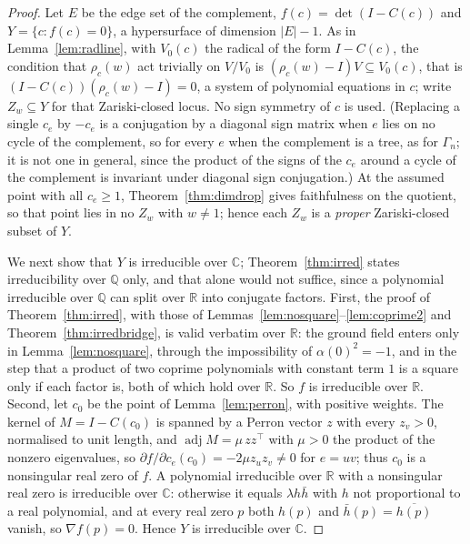 \documentclass[11pt]{article}
\theoremstyle{definition}
\theoremstyle{remark}
\theoremstyle{definition}
\newcommand{\Q}{\mathbb{Q}}
\newcommand{\R}{\mathbb{R}}
\newcommand{\C}{\mathbb{C}}
\begin{document}
\begin{proof}
Let $E$ be the edge set of the complement, $f(c)=\det(I-C(c))$ and $Y=\{c:f(c)=0\}$, a
hypersurface of dimension $|E|-1$. As in Lemma~\ref{lem:radline}, with $V_0(c)$ the radical of
the form $I-C(c)$, the condition that $\rho_c(w)$ act trivially on $V/V_0$ is $(\rho_c(w)-I)V\subseteq V_0(c)$, that is $(I-C(c))(\rho_c(w)-I)=0$, a system of
polynomial equations in $c$; write $Z_w\subseteq Y$ for that Zariski-closed locus. No sign symmetry
of $c$ is used. \textup{(}Replacing a single $c_e$ by $-c_e$ is a conjugation by a diagonal sign
matrix when $e$ lies on no cycle of the complement, so for every $e$ when the complement is a tree,
as for $\Gamma_n$; it is not one in general, since the product of the signs of the $c_e$ around a
cycle of the complement is invariant under diagonal sign conjugation.\textup{)} At the assumed point
with all $c_e\ge1$, Theorem~\ref{thm:dimdrop} gives faithfulness on the quotient, so that point lies
in no $Z_w$ with $w\ne1$; hence each $Z_w$ is a \emph{proper} Zariski-closed subset of $Y$.

We next show that $Y$ is irreducible over $\C$; Theorem~\ref{thm:irred} states irreducibility over
$\Q$ only, and that alone would not suffice, since a polynomial irreducible over $\Q$ can split over
$\R$ into conjugate factors. First, the proof of Theorem~\ref{thm:irred}, with those of
Lemmas~\ref{lem:nosquare}--\ref{lem:coprime2} and Theorem~\ref{thm:irredbridge}, is valid verbatim
over $\R$: the ground field enters only in Lemma~\ref{lem:nosquare}, through the impossibility of
$\alpha(0)^2=-1$, and in the step that a product of two coprime polynomials with constant term $1$
is a square only if each factor is, both of which hold over $\R$. So $f$ is irreducible over $\R$.
Second, let $c_0$ be the point of Lemma~\ref{lem:perron}, with positive weights. The kernel of
$M=I-C(c_0)$ is spanned by a Perron vector $z$ with every $z_v>0$, normalised to unit length, and
$\operatorname{adj}M=\mu\,zz^{\!\top}$ with $\mu>0$ the product of the nonzero eigenvalues, so $\partial f/\partial c_e(c_0)=-2\mu z_uz_v\ne0$
for $e=uv$; thus $c_0$ is a nonsingular real zero of $f$. A polynomial irreducible over $\R$ with a
nonsingular real zero is irreducible over $\C$: otherwise it equals $\lambda h\bar h$ with $h$ not
proportional to a real polynomial, and at every real zero $p$ both $h(p)$ and
$\bar h(p)=\overline{h(p)}$ vanish, so $\nabla f(p)=0$. Hence $Y$ is irreducible over $\C$.


\end{proof}
\end{document}
